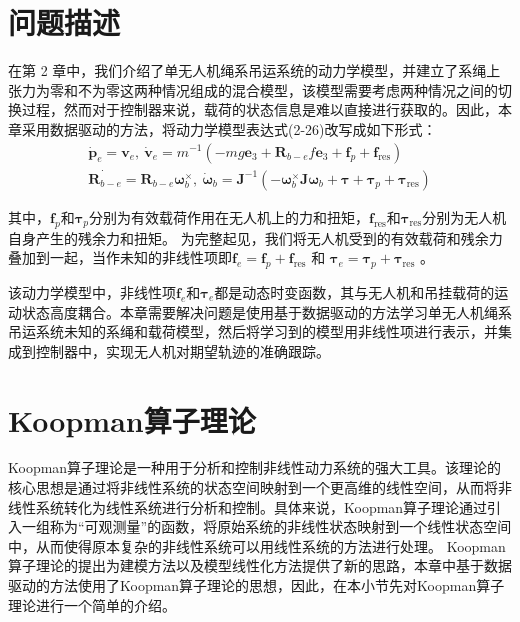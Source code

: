 \documentclass[lang=chs, degree=master, blindreview=false, winfonts=true]{yanputhesis}
\begin{document}
\section{问题描述}
在第 2 章中，我们介绍了单无人机绳系吊运系统的动力学模型，并建立了系绳上张力为零和不为零这两种情况组成的混合模型，该模型需要考虑两种情况之间的切换过程，然而对于控制器来说，载荷的状态信息是难以直接进行获取的。因此，本章采用数据驱动的方法，将动力学模型表达式(2-26)改写成如下形式：
\begin{equation}
	\begin{aligned}
		\dot{\boldsymbol{p}}_e = \boldsymbol{v}_e, \
		\dot{\boldsymbol{v}}_e = m^{-1}\left(-mg\bm{e}_3+\boldsymbol{R}_{b-e}f\bm{e}_3+\bm{f}_p+\bm{f}_{\text{res}}\right) \\
		\dot{\bm{R}_{b-e}} = \bm{R}_{b-e} \bm{\omega}_b^{\times}, \
		\dot{\boldsymbol{\omega}}_b = \boldsymbol{J}^{-1}\left(-\bm{\omega}_b^{\times}\bm{J} \bm{\omega}_b+\boldsymbol{\tau}+ \bm{\tau}_p+ \bm{\tau}_{\text{res}}\right)
	\end{aligned}\label{3-1}
\end{equation}



其中，$\bm{f}_p$和$\bm{\tau}_p$分别为有效载荷作用在无人机上的力和扭矩，$\bm{f}_\text{res}$和$\bm{\tau}_\text{res}$分别为无人机自身产生的残余力和扭矩。
为完整起见，我们将无人机受到的有效载荷和残余力叠加到一起，当作未知的非线性项即$\bm f_e = \bm f_p+ \bm f_{\text{res}}$ 和 $\bm \tau_e = \bm \tau_p+\bm \tau_{\text{res}}$ 。
	
该动力学模型中，非线性项$\bm f_e$和$\bm \tau_e$都是动态时变函数，其与无人机和吊挂载荷的运动状态高度耦合。本章需要解决问题是使用基于数据驱动的方法学习单无人机绳系吊运系统未知的系绳和载荷模型，然后将学习到的模型用非线性项进行表示，并集成到控制器中，实现无人机对期望轨迹的准确跟踪。 




\section{Koopman算子理论}

Koopman算子理论是一种用于分析和控制非线性动力系统的强大工具。该理论的核心思想是通过将非线性系统的状态空间映射到一个更高维的线性空间，从而将非线性系统转化为线性系统进行分析和控制。具体来说，Koopman算子理论通过引入一组称为“可观测量”的函数，将原始系统的非线性状态映射到一个线性状态空间中，从而使得原本复杂的非线性系统可以用线性系统的方法进行处理。
Koopman算子理论的提出为建模方法以及模型线性化方法提供了新的思路，本章中基于数据驱动的方法使用了Koopman算子理论的思想，因此，在本小节先对Koopman算子理论进行一个简单的介绍。
\end{document}
